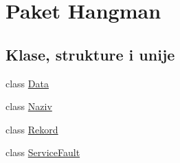 \hypertarget{namespaceHangman}{}\section{Paket Hangman}
\label{namespaceHangman}
\subsection*{Klase, strukture i unije}
\begin{DoxyCompactItemize}
\item 
class \hyperlink{classHangman_1_1Data}{Data}
\item 
class \hyperlink{classHangman_1_1Naziv}{Naziv}
\item 
class \hyperlink{classHangman_1_1Rekord}{Rekord}
\item 
class \hyperlink{classHangman_1_1ServiceFault}{Service\+Fault}
\end{DoxyCompactItemize}
